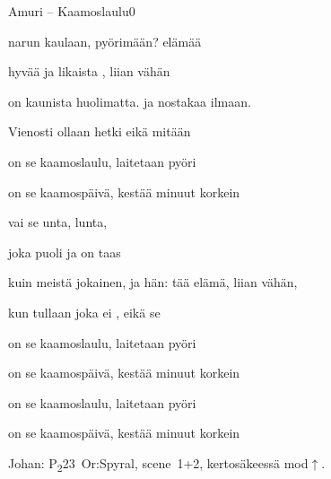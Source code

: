 \documentclass[12pt,a4paper]{article}
\begin{document}
\thispagestyle{empty}
\begin{mysong}{Amuri – Kaamoslaulu}{0}


\begin{SBVerse}
   narun kaulaan,  pyörimään?
   elämää 

  hyvää ja  likaista , liian vähän

   on kaunista  huolimatta. 
  ja nostakaa  ilmaan.

  Vienosti  ollaan hetki  eikä mitään
\end{SBVerse}

\begin{SBChorus}
   on se kaamoslaulu,  laitetaan
   pyöri

   on se kaamospäivä,  kestää 
  minuut korkein
\end{SBChorus}

\begin{SBVerse}
    vai  se unta,
   lunta,

  joka  puoli ja on taas 

   kuin meistä jokainen,  ja hän:  tää
  elämä,  liian vähän,

  kun tullaan  joka ei , eikä se 
\end{SBVerse}

\begin{SBChorus}
   on se kaamoslaulu,  laitetaan
   pyöri

   on se kaamospäivä,  kestää 
  minuut korkein
\end{SBChorus}


\begin{SBChorus}
   on se kaamoslaulu,  laitetaan
   pyöri

   on se kaamospäivä,  kestää 
  minuut korkein
\end{SBChorus}


{\SBLyricNoteFont Johan: P\textsubscript{2}23~Or:Spyral, scene~1+2,
kertosäkeessä mod$\uparrow$.}

\end{mysong}
\end{document}
